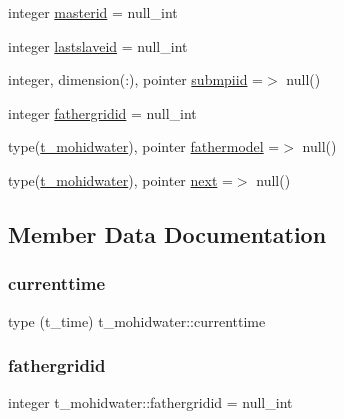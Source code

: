 \begin{DoxyCompactItemize}
\item 
integer \mbox{\hyperlink{structt__mohidwater_aee6f1cdce9bee123f704b5bbbaf23409}{masterid}} = null\+\_\+int
\item 
integer \mbox{\hyperlink{structt__mohidwater_a984574b72f9fc231f6d16cf297924eb6}{lastslaveid}} = null\+\_\+int
\item 
integer, dimension(\+:), pointer \mbox{\hyperlink{structt__mohidwater_a5fa78be1b704669273c49ea22f9fcf1e}{submpiid}} =$>$ null()
\item 
integer \mbox{\hyperlink{structt__mohidwater_ab92440ecc1231af7892092ad3f590087}{fathergridid}} = null\+\_\+int
\item 
type(\mbox{\hyperlink{structt__mohidwater}{t\+\_\+mohidwater}}), pointer \mbox{\hyperlink{structt__mohidwater_ac227e5caafada2310594d9b54c6dafab}{fathermodel}} =$>$ null()
\item 
type(\mbox{\hyperlink{structt__mohidwater}{t\+\_\+mohidwater}}), pointer \mbox{\hyperlink{structt__mohidwater_a6e1b81b4f3f2ec19270c29c4510c06c1}{next}} =$>$ null()
\end{DoxyCompactItemize}


\subsection{Member Data Documentation}
\mbox{\label{structt__mohidwater_a18a3fa1f7da7d0ce0da21d5a3684a5c3}} 
\subsubsection{\texorpdfstring{currenttime}{currenttime}}
{\footnotesize\ttfamily type (t\+\_\+time) t\+\_\+mohidwater\+::currenttime}

\mbox{\label{structt__mohidwater_ab92440ecc1231af7892092ad3f590087}} 
\subsubsection{\texorpdfstring{fathergridid}{fathergridid}}
{\footnotesize\ttfamily integer t\+\_\+mohidwater\+::fathergridid = null\+\_\+int}

